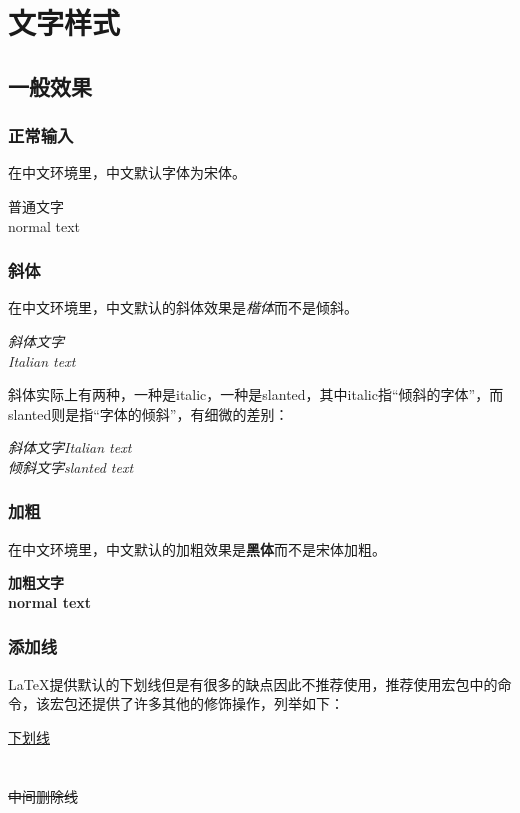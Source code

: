 \section{文字样式}\label{sec:文字样式}
    \subsection{一般效果}
    \subsubsection{正常输入}
    在中文环境里，中文默认字体为宋体。
    \begin{texshow}
        普通文字\\
        normal text
    \end{texshow}
    \subsubsection{斜体}
    
    在中文环境里，中文默认的斜体效果是\textit{楷体}而不是倾斜。
    \begin{texshow}
        \textit{斜体文字}\\
        \textit{Italian text}
    \end{texshow}

    斜体实际上有两种，一种是italic，一种是slanted，其中italic指“倾斜的字体”，而slanted则是指“字体的倾斜”，有细微的差别：
    \begin{texshow}
        \textit{斜体文字}\textit{Italian text}\\
        \textsl{倾斜文字}\textsl{slanted text}
    \end{texshow}

    \subsubsection{加粗}
    在中文环境里，中文默认的加粗效果是\textbf{黑体}而不是宋体加粗。
    \begin{texshow}
        \textbf{加粗文字}\\
        \textbf{normal text}
    \end{texshow}
    \subsubsection{添加线}

    \LaTeX{}提供默认的下划线但是有很多的缺点因此不推荐使用，推荐使用宏包中的命令，该宏包还提供了许多其他的修饰操作，列举如下：
    \begin{texshow}
        \uline{下划线}\\
        \\
        \\
        \sout{中间删除线}\\
        \\
        \\
    \end{texshow}


